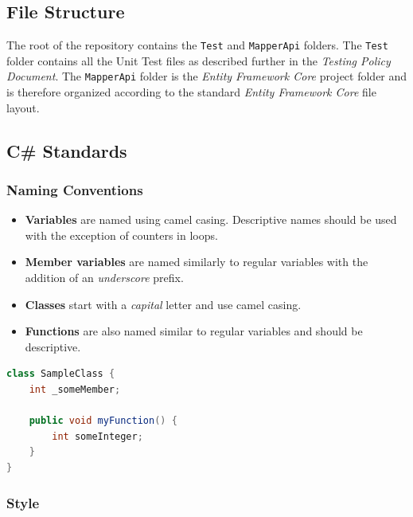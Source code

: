 \documentclass{article}
\begin{document}

    \subsection{File Structure}
    \label{sec:api-struc}

    The root of the repository contains the \texttt{Test} and \texttt{MapperApi}
    folders. The \texttt{Test} folder contains all the Unit Test files as
    described further in the \textit{Testing Policy Document}. The
    \texttt{MapperApi} folder is the \textit{Entity Framework Core} project
    folder and is therefore organized according to the standard \textit{Entity
    Framework Core} file layout.

    \subsection{C\# Standards}
    \label{sec:cs}

    \subsubsection{Naming Conventions}
    \label{sec:cs-nc}

    \begin{itemize}
        \item \textbf{Variables} are named using camel casing. Descriptive names
                should be used with the exception of counters in loops.
        \item \textbf{Member variables} are named similarly to regular variables
                with the addition of an \textit{underscore} prefix.
        \item \textbf{Classes} start with a \textit{capital} letter and use
                camel casing.
        \item \textbf{Functions} are also named similar to regular variables and
                should be descriptive.
    \end{itemize}

    \begin{lstlisting}[language=java]
class SampleClass {
    int _someMember;

    public void myFunction() {
        int someInteger;
    }
}
    \end{lstlisting}

    \subsubsection{Style}
    \label{sec:cs-st}
\end{document}
